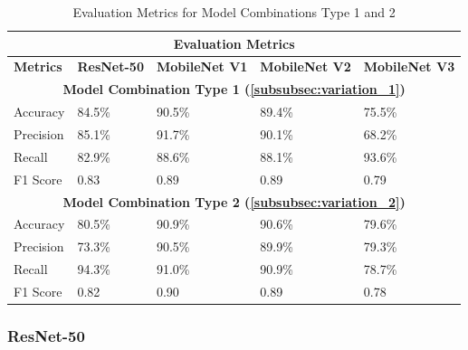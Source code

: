 \begin{table}[H]
\centering
\begin{tabularx}{\textwidth}{@{} *5{X} @{}}
\toprule
\multicolumn{5}{c}{\textbf{Evaluation Metrics}}                                    \\ \midrule
\addlinespace
\raggedright \textbf{Metrics}           & \textbf{ResNet-50} & \textbf{MobileNet V1} & \textbf{MobileNet V2} & \textbf{MobileNet V3} \\ \midrule
\multicolumn{5}{c}{\textbf{Model Combination Type 1 (\ref{subsubsec:variation_1})}}                                    \\ \midrule
Accuracy             &  84.5\%         &  90.5\%            &  89.4\%            & 75.5\%             \\ \midrule
Precision            &  85.1\%         &  91.7\%            &  90.1\%            & 68.2\%             \\ \midrule
Recall               &  82.9\%         &  88.6\%            &  88.1\%            & 93.6\%            \\ \midrule
F1 Score               &  0.83         &  0.89            &  0.89            & 0.79           \\ \midrule
\multicolumn{5}{c}{\textbf{Model Combination Type 2 (\ref{subsubsec:variation_2})}}                                    \\ \midrule
Accuracy             &  80.5\%         &  90.9\%            &  90.6\%            &   79.6\%           \\ \midrule
Precision            &  73.3\%         &  90.5\%            &  89.9\%            &   79.3\%           \\ \midrule
Recall               &  94.3\%         &  91.0\%            &  90.9\%            &   78.7\%          \\ \midrule
F1 Score               &  0.82         &  0.90            &  0.89            &   0.78         \\ 
\bottomrule
\end{tabularx}
\caption{Evaluation Metrics for Model Combinations Type 1 and 2 }
\label{table:results_6}
\end{table}

\subsubsection{ResNet-50}

